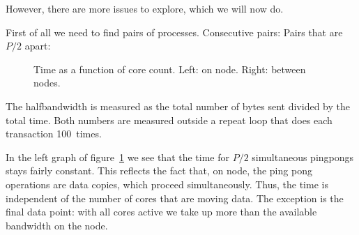 However, there are more issues to explore,
which we will now do.

First of all we need to find pairs of processes.
Consecutive pairs:
Pairs that are $P/2$ apart:

\begin{figure}[ht]
  \pgfplotsset{width=3.5in,compat=1.7}
  \hbox\bgroup

  \egroup
  \caption{Time as a function of core count. Left: on node. Right: between nodes.}
  \label{fig:hbw-interintra}
\end{figure}

The halfbandwidth is measured as the total number of bytes sent
divided by the total time.
Both numbers are measured outside a repeat loop that does each
transaction 100~times.
%

In the left graph of figure~\ref{fig:hbw-interintra} we see that the time
for $P/2$ simultaneous pingpongs stays fairly constant.
This reflects the fact that, on node, the ping pong operations are
data copies, which proceed simultaneously.
Thus, the time is independent of the number of cores that are moving data.
The exception is the final data point: with all cores active we take up
more than the available bandwidth on the node.

